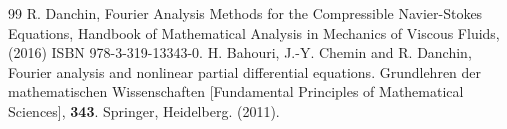 \documentclass[10pt,a4paper]{amsart}
\begin{document}
\begin{thebibliography}{99}
 R. Danchin, Fourier Analysis Methods for the Compressible Navier-Stokes Equations, Handbook of Mathematical Analysis in Mechanics of Viscous Fluids, (2016) ISBN 978-3-319-13343-0.
 H. Bahouri, J.-Y. Chemin and R. Danchin, Fourier analysis and nonlinear partial differential equations. Grundlehren der mathematischen Wissenschaften [Fundamental Principles of Mathematical Sciences], {\bf 343}. Springer, Heidelberg. (2011).
\end{thebibliography}
\end{document}
